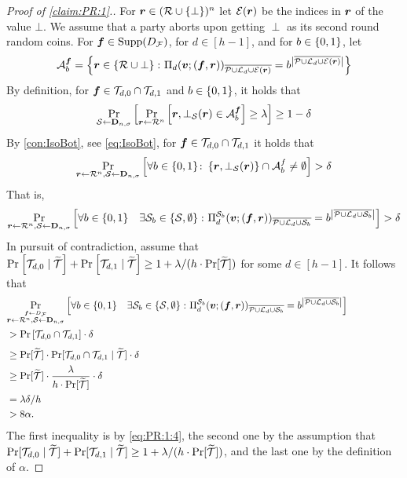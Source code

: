 \begin{proof}[Proof of \cref{claim:PR:1}.]
For ${ \boldsymbol{r}} \in (\mathcal{R}\cup\{\bot\})^n$ let $ \mathcal{E}({ \boldsymbol{r}})$ be the indices in ${ \boldsymbol{r}}$ of the value $\bot$.
We assume \wlg that a party aborts upon getting $\perp$ as its second round random coins. For ${ \boldsymbol{f}} \in \operatorname{Supp}(D_{\cal F})$, for $d\in [h-1]$, and for $b \in \{0,1\}$, let
\begin{align}
\mathcal{A}^{ \boldsymbol{f}}_b = \left\{{ \boldsymbol{r}} \in \left\{\mathcal{R} \cup \bot\right\} \colon \Pi_d({ \boldsymbol{v}};({ \boldsymbol{f}},{ \boldsymbol{r}}))_{\overline{\mathcal{P} \cup {\cal{L}}_d \cup \mathcal{E}({ \boldsymbol{r}})}} = b^{\left|\overline{\mathcal{P} \cup {\cal{L}}_d \cup \mathcal{E}({ \boldsymbol{r}})}\right|}\right\}
\end{align}
By definition, for ${ \boldsymbol{f}} \in \mathcal{T}_{d,0} \cap \mathcal{T}_{d,1}$ and $b\in \{0,1\}$, it holds that
\begin{align}
\Pr_{{\cal{S}}\gets \mathbf{D}_{n,\sigma}}\left[\Pr_{{ \boldsymbol{r}} \gets \mathcal{R}^n}\left[{ \boldsymbol{r}},\bot_{\mathcal{S}}({ \boldsymbol{r}}) \in \mathcal{A}^{ \boldsymbol{f}}_b\right] \ge \lambda\right] \ge 1-\delta
\end{align}
By \cref{con:IsoBot}, see \cref{eq:IsoBot}, for ${ \boldsymbol{f}} \in \mathcal{T}_{d,0} \cap \mathcal{T}_{d,1}$ it holds that
\begin{align*}%
\ppr{\vr\gets \rn,\cS \gets \bns}{\forall \o \in \zo \colon \set{\vr,\bot_{\cS}(\vr)}\cap \cA^f_b \neq \emptyset} > \delta
\end{align*}
That is,
\begin{align}\label{eq:PR:1:4}
\Pr_{{ \boldsymbol{r}}\gets \mathcal{R}^n,\mathcal{S} \gets \mathbf{D}_{n,\sigma}}\left[\forall b\in \{0,1\} \quad \exists {\cal{S}}_b \in \left\{{\cal{S}},\emptyset\right\} \colon \Pi^{\mathcal{S}_b}_{d}({ \boldsymbol{v}};({ \boldsymbol{f}},{ \boldsymbol{r}}))_{ \overline{\mathcal{P} \cup {\cal{L}}_d \cup\mathcal{S}_b} }= b^{ \left|\overline{ \mathcal{P} \cup {\cal{L}}_d \cup\mathcal{S}_b}\right|}\right] >\delta
\end{align}
In pursuit of contradiction, assume that $\Pr_{}\left[\mathcal{T}_{d,0} \mid {\widetilde{\mathcal{T}}}\right] + \Pr_{}\left[\mathcal{T}_{d,1} \mid {\widetilde{\mathcal{T}}}\right] \ge 1 + \lambda/(h\cdot \Pr[{\widetilde{\mathcal{T}}}])$ for some $d \in [h-1]$. It follows that
\begin{align}\label{eq:PR:1:5}
\lefteqn{\ppr{\stackrel{\vf \gets \DF}{\vr\gets \cR^n,\cS \gets \bns}}{\forall \o\in \zo \quad \exists \cs_\o \in \set{\cs,\emptyset}\colon \Pi^{ \cs_\o}_{d}(\vv;(\vf,\vr))_{ \overline{\cP \cup \cL_d \cup \cs_\o} }= \o^{ \size{\overline{ \cP \cup \cL_d \cup \cs_\o}}}}}\\
&> \pr{\cT_{d,0} \cap \cT_{d,1}}\cdot \delta \hskip30em \nonumber\\
&\ge \Pr[\tT]\cdot \Pr[\cT_{d,0} \cap \cT_{d,1} \mid \tT] \cdot \delta \nonumber\\
&\ge \Pr[\tT]\cdot \frac{\lambda}{h\cdot \Pr[\tT]} \cdot \delta \nonumber\\
&= \lambda\delta /h \nonumber\\
&> 8\alpha.\nonumber
\end{align}
The first inequality is by \cref{eq:PR:1:4}, the second one by the assumption that $\Pr[\mathcal{T}_{d,0} \mid {\widetilde{\mathcal{T}}}] + \Pr[\mathcal{T}_{d,1} \mid {\widetilde{\mathcal{T}}}] \ge 1 + \lambda/(h\cdot \Pr[{\widetilde{\mathcal{T}}}])$, and the last one by the definition of $\alpha$.


\end{proof}

